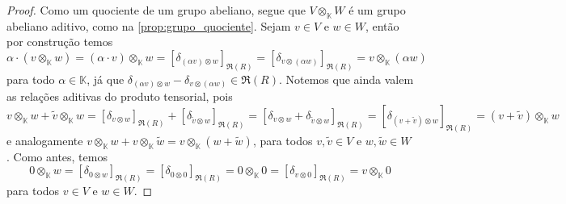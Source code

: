 \begin{proof}
    Como um quociente de um grupo abeliano, segue que \(V \otimes_{\mathbb{K}} W\) é um grupo abeliano aditivo, como na \cref{prop:grupo_quociente}. Sejam \(v \in V\) e \(w\in W\), então por construção temos
    \begin{equation*}
        \alpha \cdot (v \otimes_{\mathbb{K}} w) = (\alpha \cdot v) \otimes_{\mathbb{K}} w = [\delta_{(\alpha v)\otimes w}]_{\mathfrak{R}(R)} = [\delta_{v \otimes (\alpha w)}]_{\mathfrak{R}(R)} = v \otimes_{\mathbb{K}} (\alpha w)
    \end{equation*}
    para todo \(\alpha \in \mathbb{K}\), já que \(\delta_{(\alpha v) \otimes w} - \delta_{v \otimes (\alpha w)} \in \mathfrak{R}(R)\). Notemos que ainda valem as relações aditivas do produto tensorial, pois
    \begin{equation*}
        v \otimes_\mathbb{K} w + \tilde{v} \otimes_\mathbb{K} w = [\delta_{v \otimes w}]_{\mathfrak{R}(R)}+ [\delta_{\tilde{v} \otimes w}]_{\mathfrak{R}(R)}= [\delta_{v \otimes w} +  \delta_{\tilde{v} \otimes w}]_{\mathfrak{R}(R)} = [\delta_{(v + \tilde{v})\otimes w}]_{\mathfrak{R}(R)} = (v + \tilde{v})\otimes_{\mathbb{K}}w
    \end{equation*}
    e analogamente \(v \otimes_{\mathbb{K}} w + v \otimes_{\mathbb{K}} \tilde{w} = v \otimes_{\mathbb{K}} (w + \tilde{w})\), para todos \(v,\tilde{v} \in V\) e \(w, \tilde{w} \in W\). Como antes, temos
    \begin{equation*}
        0 \otimes_{\mathbb{K}} w = [\delta_{0 \otimes w}]_{\mathfrak{R}(R)} = [\delta_{0 \otimes 0}]_{\mathfrak{R}(R)} = 0 \otimes_{\mathbb{K}} 0 = [\delta_{v \otimes 0}]_{\mathfrak{R}(R)} = v \otimes_{\mathbb{K}} 0
    \end{equation*}
    para todos \(v \in V\) e \(w \in W\).


\end{proof}
